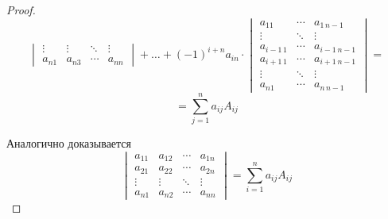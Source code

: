 \begin{proof}
\begin{equation*}
\begin{vmatrix}
\vdots & \vdots & \ddots & \vdots \\
a_{n1} & a_{n3} & \cdots & a_{nn}
\end{vmatrix} + \ldots + (-1)^{i+n} a_{in} \cdot
\begin{vmatrix}
a_{11} & \cdots & a_{1\, n-1} \\
\vdots & \ddots & \vdots \\
a_{i-1\, 1}  & \cdots & a_{i-1\, n-1} \\
a_{i+1\, 1} & \cdots & a_{i+1\, n-1} \\
\vdots & \ddots & \vdots \\
a_{n1} & \cdots & a_{n\, n-1}
\end{vmatrix} =
\end{equation*}
\begin{equation*}
= \sum_{j=1}^n a_{ij} A_{ij}
\end{equation*}

Аналогично доказывается
\begin{equation*}
\begin{vmatrix}
a_{11} & a_{12} & \cdots & a_{1n} \\
a_{21} & a_{22} & \cdots & a_{2n} \\
\vdots & \vdots & \ddots & \vdots \\
a_{n1} & a_{n2} & \cdots & a_{nn}
\end{vmatrix} =
\sum_{i=1}^n a_{ij} A_{ij}
\end{equation*}
\end{proof}

